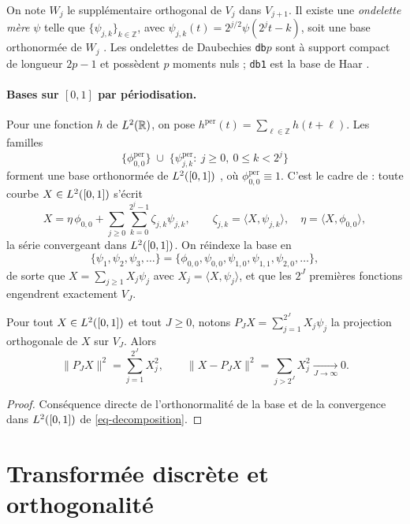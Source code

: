 On note $W_j$ le supplémentaire orthogonal de $V_j$ dans $V_{j+1}$. Il existe une \emph{ondelette mère} $\psi$ telle que $\{\psi_{j,k}\}_{k\in\mathbb{Z}}$, avec $\psi_{j,k}(t)=2^{j/2}\psi(2^jt-k)$, soit une base orthonormée de $W_j$ \citep{mallat1989theory,daubechies1992ten}. Les ondelettes de Daubechies \texttt{db}$p$ sont à support compact de longueur $2p-1$ et possèdent $p$ moments nuls ; \texttt{db1} est la base de Haar \citep{haar1910theorie}.

\paragraph{Bases sur $[0,1]$ par périodisation.} Pour une fonction $h$ de $L^2(\mathbb{R})$, on pose $h^{\mathrm{per}}(t)=\sum_{\ell\in\mathbb{Z}}h(t+\ell)$. Les familles
\[
  \bigl\{\phi_{0,0}^{\mathrm{per}}\bigr\}\;\cup\;\bigl\{\psi_{j,k}^{\mathrm{per}}:\ j\ge0,\ 0\le k<2^j\bigr\}
\]
forment une base orthonormée de $L^2([0,1])$ \citep[section 9.3]{daubechies1992ten}, où $\phi^{\mathrm{per}}_{0,0}\equiv1$. C'est le cadre de \citet{berlinet2008functional} : toute courbe $X\in L^2([0,1])$ s'écrit
\begin{equation}\label{eq-decomposition}
  X = \eta\,\phi_{0,0} + \sum_{j\ge0}\sum_{k=0}^{2^j-1}\zeta_{j,k}\psi_{j,k},
  \qquad \zeta_{j,k}=\langle X,\psi_{j,k}\rangle,\quad \eta=\langle X,\phi_{0,0}\rangle,
\end{equation}
la série convergeant dans $L^2([0,1])$. On réindexe la base en
\[
  \{\psi_1,\psi_2,\psi_3,\dots\}=\{\phi_{0,0},\psi_{0,0},\psi_{1,0},\psi_{1,1},\psi_{2,0},\dots\},
\]
de sorte que $X=\sum_{j\ge1}X_j\psi_j$ avec $X_j=\langle X,\psi_j\rangle$, et que les $2^J$ premières fonctions engendrent exactement $V_J$.

\begin{proposition}\label{prop-parseval}
Pour tout $X\in L^2([0,1])$ et tout $J\ge0$, notons $P_J X=\sum_{j=1}^{2^J}X_j\psi_j$ la projection orthogonale de $X$ sur $V_J$. Alors
\[
  \|P_JX\|^2=\sum_{j=1}^{2^J}X_j^2,\qquad \|X-P_JX\|^2=\sum_{j>2^J}X_j^2\xrightarrow[J\to\infty]{}0.
\]
\end{proposition}

\begin{proof}
Conséquence directe de l'orthonormalité de la base et de la convergence dans $L^2([0,1])$ de \eqref{eq-decomposition}.
\end{proof}

\section{Transformée discrète et orthogonalité}\label{sec-dwt}

